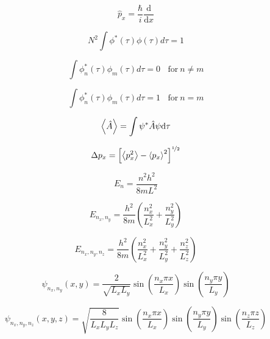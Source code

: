 \documentclass[12pt, letterpaper]{memoir}
\begin{document}
		\begin{minipage}{0.495\textwidth}	
			\begin{equation*}
			\hat{p}_x = \dfrac{\hbar}{i}\dfrac{\mathrm{d}}{\mathrm{d}x}
			\end{equation*}	
			
			\begin{equation*}
			N^{2} \int \phi^*(\tau)\phi(\tau)d\tau = 1
			\end{equation*}
			
			\begin{equation*}
			\int{\phi^*_n(\tau)\phi_m(\tau)d\tau} = 0 ~~~~ \text{for}~n\neq m
			\end{equation*}
			
			\begin{equation*}
				\int{\phi^*_n(\tau)\phi_m(\tau)d\tau} = 1 ~~~~ \text{for}~n = m
			\end{equation*}
			
			\begin{equation*}
			\left< \hat{A} \right> = \displaystyle\int\psi^*\hat{A}\psi\mathrm{d}\tau
			\end{equation*}
			
			\begin{equation*}
			\Delta p_x = \left[\left< p_x^2 \right>-\left< p_x \right>^2\right]^{\nicefrac{1}{2}}
			\end{equation*}			
			
			\begin{equation*}
			E_n = \dfrac{n^2h^2}{8mL^2}
			\end{equation*}
			
			\begin{equation*}
				E_{n_x,n_y} = \dfrac{h^2}{8m}\left(\frac{n_x^2}{L_x^2}+\frac{n_y^2}{L_y^2}\right)
			\end{equation*}
			
			\begin{equation*}
				E_{n_x,n_y,n_z} = \dfrac{h^2}{8m}\left(\frac{n_x^2}{L_x^2}+\frac{n_y^2}{L_y^2}+\frac{n_z^2}{L_z^2}\right)
			\end{equation*}		
		\end{minipage}

	\begin{equation*}
		\psi_{n_x,n_y}(x,y) = \dfrac{2}{\sqrt{L_xL_y}}\sin\left(\dfrac{n_x\pi x}{L_x}\right)\sin\left(\dfrac{n_y\pi y}{L_y}\right)
	\end{equation*}

	\begin{equation*}
		\psi_{n_x,n_y,n_z}(x,y,z) = \sqrt{\dfrac{8}{L_xL_yL_z}}\sin\left(\dfrac{n_x\pi x}{L_x}\right)\sin\left(\dfrac{n_y\pi y}{L_y}\right)\sin\left(\dfrac{n_z\pi z}{L_z}\right)
	\end{equation*}
\end{document}
